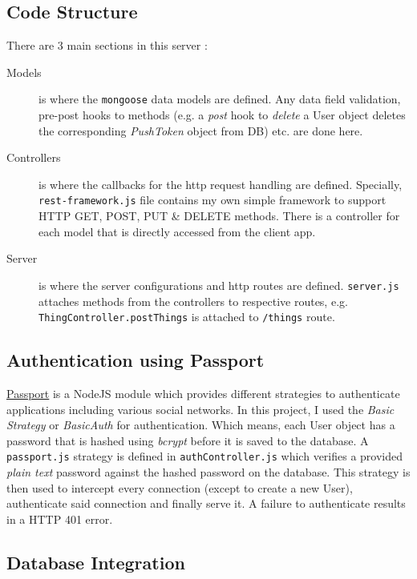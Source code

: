 \subsection{Code Structure}

There are 3 main sections in this server :

\begin{description}
	\item [Models] is where the \texttt{mongoose} data models are defined. Any data field validation, pre-post hooks to methods (e.g. a \textit{post} hook to \textit{delete} a User object deletes the corresponding \textit{PushToken} object from DB) etc. are done here.
	\item [Controllers] is where the callbacks for the http request handling are defined. Specially, \texttt{rest-framework.js} file contains my own simple framework to support HTTP GET, POST, PUT \& DELETE methods. There is a controller for each model that is directly accessed from the client app.
	\item [Server] is where the server configurations and http routes are defined. \texttt{server.js} attaches methods from the controllers to respective routes, e.g. \texttt{ThingController.postThings} is attached to \texttt{/things} route.
\end{description}

\subsection{Authentication using Passport}

\href{http://passportjs.org}{Passport} is a NodeJS module which provides different strategies to authenticate applications including various social networks. In this project, I used the \textit{Basic Strategy} or \textit{BasicAuth} for authentication. Which means, each User object has a password that is hashed using \textit{bcrypt} before it is saved to the database. A \texttt{passport.js} strategy is defined in \texttt{authController.js} which verifies a provided \textit{plain text} password against the hashed password on the database. This strategy is then used to intercept every connection (except to create a new User), authenticate said connection and finally serve it. A failure to authenticate results in a HTTP 401 error.

\subsection{Database Integration}

